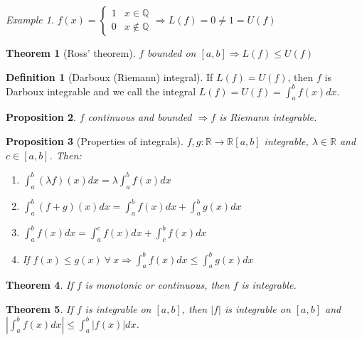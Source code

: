 \documentclass{article}
\newcommand{\abs}[1]{\left|#1\right|}
\newcommand{\Ar}{\Rightarrow}
\newenvironment{enumarabic}{\begin{enumerate}[label=(\arabic*)]}{\end{enumerate}}
\newcommand{\fOnR}[1]{#1 : \mathbb{R} \rightarrow \mathbb{R}}
\newcommand{\intcc}[1]{\left[#1\right]}
\theoremstyle{definition}
\newtheorem{definition}{Definition}[section]
\theoremstyle{definition}
\theoremstyle{plain}
\newtheorem{theorem}{Theorem}[section]
\theoremstyle{plain}
\theoremstyle{plain}
\theoremstyle{plain}
\newtheorem{proposition}[theorem]{Proposition}
\theoremstyle{definition}
\theoremstyle{remark}
\newtheorem{exampled}{Example}[definition]
\theoremstyle{remark}
\theoremstyle{remark}
\theoremstyle{remark}
\newcommand{\Q}{\mathbb{Q}}
\newcommand{\R}{\mathbb{R}}
\newcommand{\ForAll}{\ \forall \ }
\begin{document}
\begin{exampled}
  $f(x) = \begin{cases}1 & x \in \Q \\ 0 & x \notin \Q\end{cases} \Ar L(f) = 0 \neq 1 = U(f)$
\end{exampled}


\begin{theorem}[Ross' theorem]
  $f$ bounded on $\intcc{a,b} \Ar L(f) \leq U(f)$
\end{theorem}


\begin{definition}[Darboux (Riemann) integral]
    If $L(f) = U(f)$, then $f$ is Darboux integrable and we call the integral $L(f) = U(f) = \int_a^b f(x) dx$.
\end{definition}


\begin{proposition}
  $f$ continuous and bounded $\Ar f$ is Riemann integrable.
\end{proposition}



\begin{proposition}[Properties of integrals]
  $\fOnR{f,g}{\intcc{a,b}}$ integrable, $\lambda \in \R$ and $c \in \intcc{a,b}$. Then:
  \begin{enumarabic}
    \item $\int_a^b (\lambda f)(x) dx = \lambda \int_a^b f(x) dx$
    \item $\int_a^b (f+g)(x) dx = \int_a^b f(x) dx + \int_a^b g(x) dx$
    \item $\int_a^b f(x) dx = \int_a^c f(x) dx + \int_c^b f(x) dx$
    \item If $f(x) \leq g(x) \ForAll x \Ar \int_a^b f(x) dx \leq \int_a^b g(x) dx$
  \end{enumarabic}
\end{proposition}



\begin{theorem}
  If $f$ is monotonic or continuous, then $f$ is integrable.
\end{theorem}


\begin{theorem}
  If $f$ is integrable on $\intcc{a,b}$, then $|f|$ is integrable on $\intcc{a,b}$ and $\abs{\int_a^b f(x) dx} \leq \int_a^b |f(x)| dx$.
\end{theorem}
\end{document}
